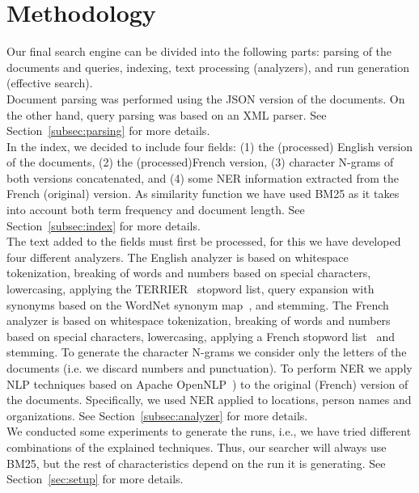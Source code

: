 \section{Methodology}\label{sec:methodology}

Our final search engine can be divided into the following parts: parsing of the documents and queries, indexing,
text processing (analyzers), and run generation (effective search).\\

Document parsing was performed using the JSON version of the documents.
On the other hand, query parsing was based on an XML parser.
See Section~\ref{subsec:parsing} for more details.\\

In the index, we decided to include four fields: (1) the (processed) English version of the documents, (2) the
(processed)French version, (3) character N-grams of both versions concatenated, and (4) some NER information extracted
from the French (original) version.
As similarity function we have used BM25 as it takes into account both term frequency and document length.
See Section~\ref{subsec:index} for more details.\\

The text added to the fields must first be processed, for this we have developed four different analyzers.
The English analyzer is based on whitespace tokenization, breaking of words and numbers based on special characters,
lowercasing, applying the TERRIER~\cite{OunisEtAl2006} stopword list, query expansion with synonyms based on
the WordNet synonym map~\cite{wordnet}, and stemming.
The French analyzer is based on whitespace tokenization, breaking of words and numbers based on special characters,
lowercasing, applying a French stopword list~\cite{stopword_french} and stemming.
To generate the character N-grams we consider only the letters of the documents (i.e. we discard numbers and punctuation).
To perform NER we apply NLP techniques based on Apache OpenNLP~\cite{ApacheOpenNLP}) to the original (French) version of
the documents.
Specifically, we used NER applied to locations, person names and organizations.
See Section~\ref{subsec:analyzer} for more details.\\

We conducted some experiments to generate the runs, i.e., we have tried different combinations of the explained
techniques.
Thus, our searcher will always use BM25, but the rest of characteristics depend on the run it is generating.
See Section~\ref{sec:setup} for more details.